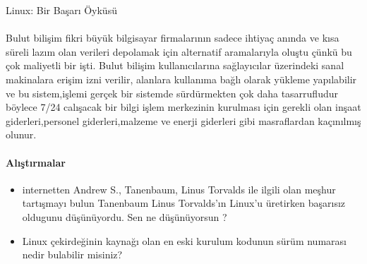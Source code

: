 \documentclass[10pt,a5paper]{book}
\begin{document}
\begin{section}{Linux: Bir Başarı Öyküsü}
\paragraph{}{Bulut bilişim fikri büyük bilgisayar firmalarının sadece ihtiyaç anında ve kısa süreli lazım olan verileri depolamak için alternatif aramalarıyla oluştu çünkü bu çok maliyetli bir işti. Bulut bilişim kullanıcılarına sağlayıcılar üzerindeki sanal makinalara erişim izni verilir, alanlara kullanıma bağlı olarak yükleme yapılabilir ve bu sistem,işlemi gerçek bir sistemde sürdürmekten çok daha tasarrufludur böylece 7/24 calışacak bir bilgi işlem merkezinin kurulması için gerekli olan inşaat giderleri,personel giderleri,malzeme ve enerji giderleri gibi masraflardan kaçınılmış olunur.}
\paragraph{Alıştırmalar}{}
\begin{itemize}
 \item internetten Andrew S., Tanenbaum, Linus Torvalds ile ilgili olan meşhur tartışmayı bulun Tanenbaum Linus Torvalds'ın Linux'u üretirken başarısız oldugunu düşünüyordu. Sen ne düşünüyorsun ?
 \item Linux çekirdeğinin kaynağı olan en eski kurulum kodunun sürüm numarası nedir bulabilir misiniz?
\end{itemize}
\end{section}
\end{document}
